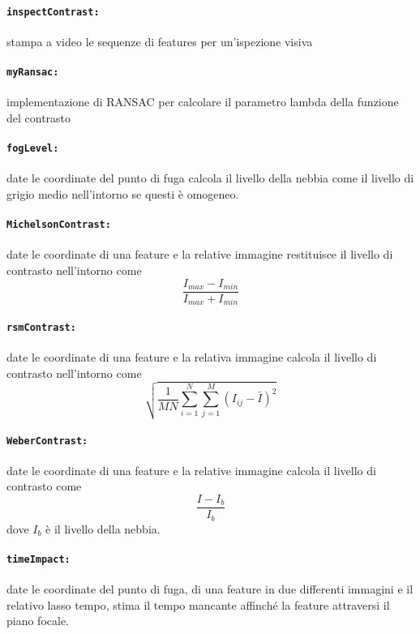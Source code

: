 \documentclass[12pt]{report}
\begin{document}
\paragraph*{\verb_inspectContrast:_} stampa a video le sequenze di features per un'ispezione visiva

\paragraph*{\verb_myRansac:_} implementazione di RANSAC per calcolare il parametro lambda della funzione del contrasto







\paragraph*{\verb_fogLevel:_} date le coordinate del punto di fuga calcola il livello della nebbia come il livello di grigio medio nell'intorno se questi \`e omogeneo.

\paragraph*{\verb_MichelsonContrast:_} date le coordinate di una feature e la relative immagine restituisce il livello di contrasto nell'intorno come $$\frac{I_{max}-I_{min}}{I_{max}+I_{min}}$$

\paragraph*{\verb_rsmContrast:_} date le coordinate di una feature e la relativa immagine calcola il livello di contrasto nell'intorno come $$\sqrt{\frac{1}{MN}\sum_{i=1}^N\sum_{j=1}^M(I_{ij}-\bar{I})^2}$$

\paragraph*{\verb_WeberContrast:_} date le coordinate di una feature e la relative immagine calcola il livello di contrasto come $$\frac{I-I_b}{I_b}$$ dove $I_b$ \`e il livello della nebbia.

\paragraph*{\verb_timeImpact:_} date le coordinate del punto di fuga, di una feature in due differenti immagini e il relativo lasso tempo, stima il tempo mancante affinch\'e la feature attraversi il piano focale. %
\end{document}
